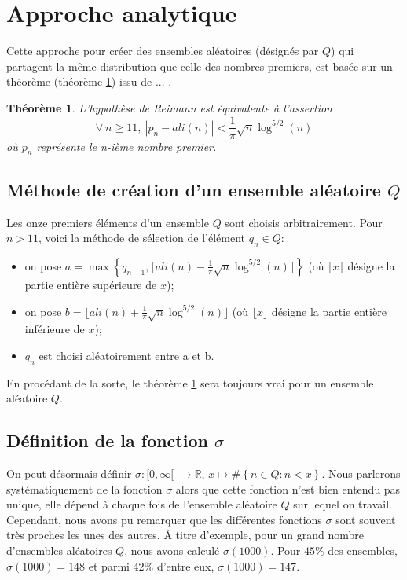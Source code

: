 \documentclass [a4paper, 11pt, twoside] {article}
\begin{document}
\theoremstyle{plain}
\newtheorem{Thm}{Théorème}

\section{Approche analytique}

Cette approche pour créer des ensembles aléatoires (désignés par $Q$) qui partagent la même distribution que celle des nombres
premiers, est basée sur un théorème (théorème \ref{theorem}) issu de ... . 

\begin{Thm}
\label{theorem}
	L'hypothèse de Reimann est équivalente à l'assertion 
	\[
	\forall \ n \geqslant 11, \ |p_{n} - ali(n) | < \frac{1}{\pi} \sqrt{n} \log^{5/2}(n) 
	\]
	où $p_{n}$ représente le n-ième nombre premier.
\end{Thm}

\subsection{Méthode de création d'un ensemble aléatoire $Q$}

Les onze premiers éléments d'un ensemble $Q$ sont choisis arbitrairement. 
Pour $ n > 11 $, voici la méthode de sélection  de l'élément $q_{n} \in Q$: 
\begin{itemize}
	\item on pose $ a = \max \left\{ q_{n-1} ,\lceil{ali(n) - \frac{1}{\pi} \sqrt{n} \log^{5/2}(n) \rceil} \right\}$ 
	(où $\lceil x \rceil$ désigne la partie entière supérieure de $x$);
	\item on pose $ b = \lfloor ali(n) + \frac{1}{\pi} \sqrt{n} \log^{5/2}(n) \rfloor $
	(où $\lfloor x \rfloor$ désigne la partie entière inférieure de $x$);
	\item $ q_{n} $ est choisi aléatoirement entre a et b. 
\end{itemize}
En procédant de la sorte, le théorème \ref{theorem} sera toujours vrai pour un ensemble aléatoire $Q$.

\subsection{Définition de la fonction $\sigma$}

On peut désormais définir $ \sigma : [0, \infty [$  $\rightarrow \mathbb{R} $, $ x \mapsto \# \left\{ n \in Q : n < x \right\} $. Nous parlerons systématiquement de  la fonction $\sigma$ alors que cette fonction n'est bien entendu pas unique, elle dépend à chaque fois de l'ensemble aléatoire $Q$ sur lequel on travail. Cependant, nous avons pu remarquer que  les différentes fonctions $\sigma$ sont souvent très proches les unes des autres. À titre d'exemple,  pour un grand nombre d'ensembles aléatoires $Q$, nous avons calculé $\sigma(1000)$. Pour $45 \%$ des ensembles, $\sigma(1000) = 148$ et parmi $42\%$ d'entre eux, $\sigma(1000) = 147$.
\end{document}
